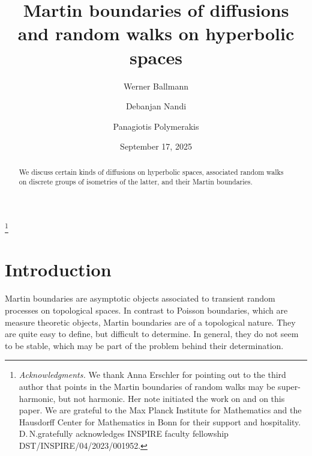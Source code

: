 \documentclass[12pt,a4paper]{amsart}
\numberwithin{equation}{section}
\theoremstyle{definition}
\begin{document}
\title[Martin boundaries of diffusions and random walks]{Martin boundaries of diffusions and random walks on hyperbolic spaces}
\author{Werner Ballmann}
\address{WB: Max Planck Institute for Mathematics, Vivatsgasse 7, 53111 Bonn}
\author{Debanjan Nandi}
\address{DN: Stat-Math unit, Indian Statistical Institute, 203 B.T. Road, Kolkata-700108}
\author{Panagiotis Polymerakis}
\address{PP: Department of Mathematics, University of Thessaly, 3rd km Old National Road Lamia–Athens, 35100, Lamia, Greece}

\begin{abstract}
We discuss certain kinds of diffusions on hyperbolic spaces, associated random walks on discrete groups of iso\-metries of the latter, and their Martin boundaries.    
\end{abstract}

\date{September 17, 2025}


\thanks{\emph{Acknowledgments.}
We thank Anna Erschler for pointing out to the third author that points in the Martin boundaries of random walks may be super-harmonic, but not harmonic.
Her note initiated the work on \cite{BPe} and on this paper.
We are grateful to the Max Planck Institute for Mathematics
and the Hausdorff Center for Mathematics in Bonn for their support and hospitality. 
D.\,N.\;gratefully acknowledges INSPIRE faculty fellowship DST/INSPIRE/04/2023/001952.}
\maketitle


\setcounter{tocdepth}{1}
\tableofcontents

\section*{Introduction}

Martin boundaries are asymptotic objects associated to transient random processes on topological spaces.
In contrast to Poisson boundaries, which are measure theoretic objects, Martin boundaries are of a topological nature.
They are quite easy to define, but difficult to determine.
In general, they do not seem to be stable, which may be part of the problem behind their determination.
\end{document}
